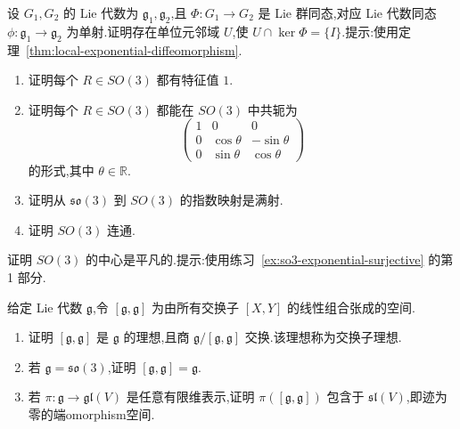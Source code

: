 {\begin{exercise}\label{ex:injective-lie-map-local-kernel}
设 $G_1,G_2$ 的 Lie 代数为 $\mathfrak g_1,\mathfrak g_2$,且 $\Phi:G_1\to G_2$ 是 Lie 群同态,对应 Lie 代数同态 $\phi:\mathfrak g_1\to\mathfrak g_2$ 为单射.证明存在单位元邻域 $U$,使 $U\cap\ker\Phi=\{I\}$.提示:使用定理~\ref{thm:local-exponential-diffeomorphism}.
\end{exercise}

\begin{exercise}[$SO(3)$ 的指数与连通性]\label{ex:so3-exponential-surjective}
\begin{enumerate}
\item 证明每个 $R\in SO(3)$ 都有特征值 $1$.
\item 证明每个 $R\in SO(3)$ 都能在 $SO(3)$ 中共轭为
\[
\begin{pmatrix}1&0&0\\0&\cos\theta&-\sin\theta\\0&\sin\theta&\cos\theta\end{pmatrix}
\]
的形式,其中 $\theta\in\mathbb R$.
\item 证明从 $\mathfrak{so}(3)$ 到 $SO(3)$ 的指数映射是满射.
\item 证明 $SO(3)$ 连通.
\end{enumerate}
\end{exercise}

\begin{exercise}[$SO(3)$ 的中心]\label{ex:so3-center}
证明 $SO(3)$ 的中心是平凡的.提示:使用练习~\ref{ex:so3-exponential-surjective} 的第 1 部分.
\end{exercise}

\begin{exercise}[交换子理想]\label{ex:commutator-ideal}
给定 Lie 代数 $\mathfrak g$,令 $[\mathfrak g,\mathfrak g]$ 为由所有交换子 $[X,Y]$ 的线性组合张成的空间.
\begin{enumerate}
\item 证明 $[\mathfrak g,\mathfrak g]$ 是 $\mathfrak g$ 的理想,且商 $\mathfrak g/[\mathfrak g,\mathfrak g]$ 交换.该理想称为交换子理想.
\item 若 $\mathfrak g=\mathfrak{so}(3)$,证明 $[\mathfrak g,\mathfrak g]=\mathfrak g$.
\item 若 $\pi:\mathfrak g\to\mathfrak{gl}(V)$ 是任意有限维表示,证明 $\pi([\mathfrak g,\mathfrak g])$ 包含于 $\mathfrak{sl}(V)$,即迹为零的端omorphism空间.
\end{enumerate}
\end{exercise}

}
